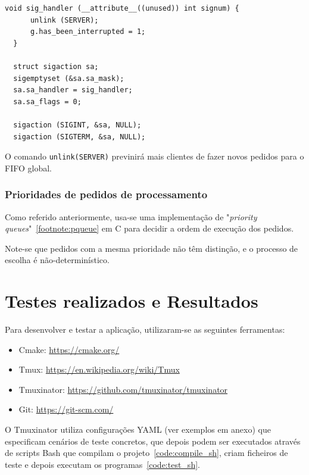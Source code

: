 \documentclass[11pt,a4paper]{report}%
\begin{document}
\label{code:server_signal}
\begin{lstlisting}[caption={Tratamento de sinais no servidor}]
  void sig_handler (__attribute__((unused)) int signum) {
      unlink (SERVER);
      g.has_been_interrupted = 1;
  }

  struct sigaction sa;
  sigemptyset (&sa.sa_mask);
  sa.sa_handler = sig_handler;
  sa.sa_flags = 0;

  sigaction (SIGINT, &sa, NULL);
  sigaction (SIGTERM, &sa, NULL);
\end{lstlisting}

O comando \lstinline{unlink(SERVER)} previnirá mais clientes de fazer novos pedidos para o FIFO global.

\subsection{Prioridades de pedidos de processamento}

Como referido anteriormente, usa-se uma implementação de "\textit{priority queues}"~\ref{footnote:pqueue} em C
para decidir a ordem de execução dos pedidos.

Note-se que pedidos com a mesma prioridade não têm distinção, e o processo de escolha é não-determinístico.

\chapter{Testes realizados e Resultados} \label{chap:bash_testes} %

Para desenvolver e testar a aplicação, utilizaram-se as seguintes ferramentas:

\begin{itemize}
  \item Cmake: \url{https://cmake.org/}
  \item Tmux: \url{https://en.wikipedia.org/wiki/Tmux}
  \item Tmuxinator: \url{https://github.com/tmuxinator/tmuxinator}
  \item Git: \url{https://git-scm.com/}
\end{itemize}

O Tmuxinator utiliza configurações YAML (ver exemplos em anexo) que especificam cenários
de teste concretos, que depois podem ser executados através de scripts Bash que compilam
o projeto~\ref{code:compile_sh}, criam ficheiros de teste e depois executam os programas~\ref{code:test_sh}.\\
\end{document}
